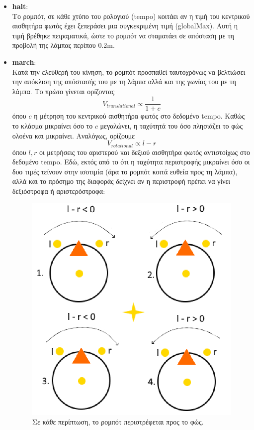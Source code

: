 \documentclass{article}
\newcommand{\lt}[1]{\latintext #1\greektext}
\newcommand{\blt}[1]{\lt{\textbf{#1}}}
\begin{document}
\begin{itemize}
    \item \blt{halt}:\\
    Το ρομπότ, σε κάθε χτύπο του ρολογιού (\lt{tempo}) κοιτάει αν η τιμή του κεντρικού αισθητήρα φωτός έχει ξεπεράσει μια συγκεκριμένη τιμή (\lt{globalMax}).
    Αυτή η τιμή βρέθηκε πειραματικά, ώστε το ρομπότ να σταματάει σε απόσταση με τη προβολή της λάμπας περίπου 0.2\lt{m}. 
    \item \blt{march}:\\
    Κατά την ελεύθερή του κίνηση, το ρομπότ προσπαθεί ταυτοχρόνως να βελτιώσει την απόκλιση της απόστασής του με τη λάμπα αλλά και της γωνίας του με τη λάμπα. Το πρώτο γίνεται ορίζοντας \[V_{translational} \propto \frac{1}{1 + c}\] όπου $c$ η μέτρηση του κεντρικού αισθητήρα φωτός στο δεδομένο \lt{tempo}. Καθώς το κλάσμα μικραίνει όσο το $c$ μεγαλώνει, η ταχύτητά του όσο πλησιάζει το φώς ολοένα και μικραίνει.
    Αναλόγως, ορίζουμε \[V_{rotational} \propto l - r\] όπου $l, r$ οι μετρήσεις του αριστερού και δεξιού αισθητήρα φωτός αντιστοίχως στο δεδομένο \lt{tempo}. Εδώ, εκτός από το ότι η ταχύτητα περιστροφής μικραίνει όσο οι δυο τιμές τείνουν στην ισοτιμία (άρα το ρομπότ κοιτά ευθεία προς τη λάμπα), αλλά και το πρόσημο της διαφοράς δείχνει αν η περιστροφή πρέπει να γίνει δεξιόστροφα ή αριστερόστροφα:
    \begin{figure}[h]
        \centering
        \includegraphics[scale=0.5]{images/align.png}
        \caption{Σε κάθε περίπτωση, το ρομπότ περιστρέφεται προς το φώς.}
        \label{fig:enter-label}
    \end{figure}


\end{itemize}
\end{document}
